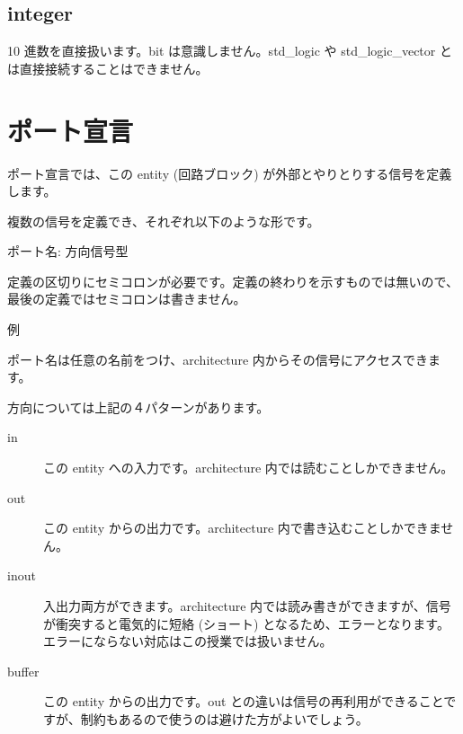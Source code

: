 \documentclass[letterpaper,10pt,dvipdfmx]{sphinxmanual}
\begin{document}
\subsection{integer}
\label{\detokenize{04_vhdl:integer}}
10 進数を直接扱います。bit は意識しません。std\_logic や std\_logic\_vector とは直接接続することはできません。


\section{ポート宣言}
\label{\detokenize{04_vhdl:id8}}
ポート宣言では、この entity  (回路ブロック) が外部とやりとりする信号を定義します。

複数の信号を定義でき、それぞれ以下のような形です。

ポート名: 方向信号型

定義の区切りにセミコロンが必要です。定義の終わりを示すものでは無いので、最後の定義ではセミコロンは書きません。

例

\begin{sphinxVerbatim}[commandchars=\\\{\}]
   
     
   
   
\end{sphinxVerbatim}

ポート名は任意の名前をつけ、architecture 内からその信号にアクセスできます。

方向については上記の４パターンがあります。
\begin{description}
\item[{in}] \leavevmode
この entity への入力です。architecture 内では読むことしかできません。

\item[{out}] \leavevmode
この entity からの出力です。architecture 内で書き込むことしかできません。

\item[{inout}] \leavevmode
入出力両方ができます。architecture 内では読み書きができますが、信号が衝突すると電気的に短絡 (ショート) となるため、エラーとなります。エラーにならない対応はこの授業では扱いません。

\item[{buffer}] \leavevmode
この entity からの出力です。out との違いは信号の再利用ができることですが、制約もあるので使うのは避けた方がよいでしょう。

\end{description}
\end{document}
